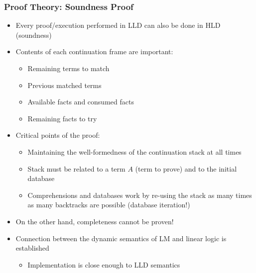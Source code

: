 \begin{frame}[fragile]
   \frametitle{Proof Theory: Soundness Proof}
   \begin{itemize}
      \item Every proof/execution performed in LLD can also be done in HLD (soundness)
      \item Contents of each continuation frame are important:
      \begin{itemize}
         \item Remaining terms to match
         \item Previous matched terms
         \item Available facts and consumed facts
         \item Remaining facts to try
      \end{itemize}
      \pause
      \item Critical points of the proof:
      \begin{itemize}
         \item Maintaining the well-formedness of the continuation stack at all times
         \item Stack must be related to a term $A$ (term to prove) and to the initial database
         \item Comprehensions and databases work by re-using the stack as many times as many backtracks are possible (database iteration!)
      \end{itemize}
      \pause
      \item On the other hand, completeness cannot be proven!
      \pause
      \item Connection between the dynamic semantics of LM and linear logic is established
      \begin{itemize}
         \item Implementation is close enough to LLD semantics
      \end{itemize}
   \end{itemize}
\end{frame}
